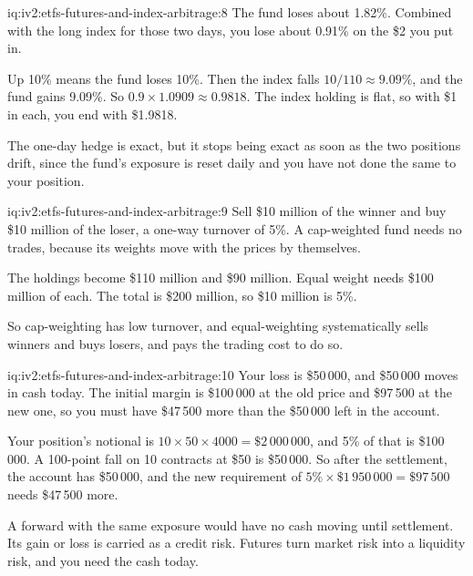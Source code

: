 \begin{solution}{iq:iv2:etfs-futures-and-index-arbitrage:8}
The fund loses about 1.82\%. Combined with the long index for those two days, you lose about 0.91\% on the \$2 you put in.

Up 10\% means the fund loses 10\%. Then the index falls $10/110 \approx 9.09\%$, and the fund gains 9.09\%. So $0.9 \times 1.0909 \approx 0.9818$. The index holding is flat, so with \$1 in each, you end with \$1.9818.

The one-day hedge is exact, but it stops being exact as soon as the two positions drift, since the fund's exposure is reset daily and you have not done the same to your position.

\end{solution}

\begin{solution}{iq:iv2:etfs-futures-and-index-arbitrage:9}
Sell \$10 million of the winner and buy \$10 million of the loser, a one-way turnover of 5\%. A cap-weighted fund needs no trades, because its weights move with the prices by themselves.

The holdings become \$110 million and \$90 million. Equal weight needs \$100 million of each. The total is \$200 million, so \$10 million is 5\%.

So cap-weighting has low turnover, and equal-weighting systematically sells winners and buys losers, and pays the trading cost to do so.

\end{solution}

\begin{solution}{iq:iv2:etfs-futures-and-index-arbitrage:10}
Your loss is \$50\,000, and \$50\,000 moves in cash today. The initial margin is \$100\,000 at the old price and \$97\,500 at the new one, so you must have \$47\,500 more than the \$50\,000 left in the account.

Your position's notional is $10 \times 50 \times 4000 = \$2\,000\,000$, and 5\% of that is \$100\,000. A 100-point fall on 10 contracts at \$50 is \$50\,000. So after the settlement, the account has \$50\,000, and the new requirement of $5\% \times \$1\,950\,000 = \$97\,500$ needs \$47\,500 more.

A forward with the same exposure would have no cash moving until settlement. Its gain or loss is carried as a credit risk. Futures turn market risk into a liquidity risk, and you need the cash today.

\end{solution}

